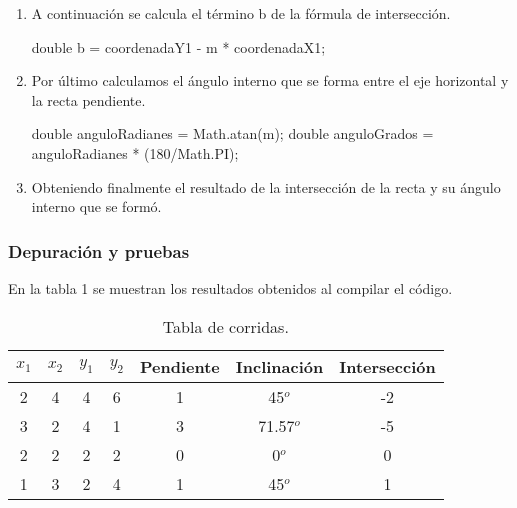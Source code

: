 \begin{enumerate}
    \item A continuación se calcula el término b de la fórmula de intersección.

    \begin{javaCode}
        double b = coordenadaY1 - m * coordenadaX1;
    \end{javaCode}

    \item Por último calculamos el ángulo interno que se forma entre el eje horizontal y la recta pendiente.
    
    \begin{javaCode}
        double anguloRadianes = Math.atan(m);
        double anguloGrados = anguloRadianes * (180/Math.PI);
    \end{javaCode}

    \item Obteniendo finalmente el resultado de la intersección de la recta y su ángulo interno que se formó.
\end{enumerate}
\subsubsection{Depuración y pruebas}
En la tabla 1 se muestran los resultados obtenidos al compilar el código.\\
\begin{table}[!ht]
\label{T:equipos}
\begin{center}
\begin{tabular}{| c | c | c | c | c | c | c |}
\hline
\textbf{$x_1$} & \textbf{$x_2$} & \textbf{$y_1$} & \textbf{$y_2$} & \textbf{Pendiente} & \textbf{Inclinación} & \textbf{Intersección} \\
\hline
2 & 4 & 4 & 6 & 1 & 45$^o$ & -2 \\
3 & 2 & 4 & 1 & 3 & 71.57$^o$ & -5 \\
2 & 2 & 2 & 2 & 0 & 0$^o$ & 0 \\
1 & 3 & 2 & 4 & 1 & 45$^o$ & 1 \\
\hline
\end{tabular}
\caption{Tabla de corridas.}
\end{center}
\end{table}\\